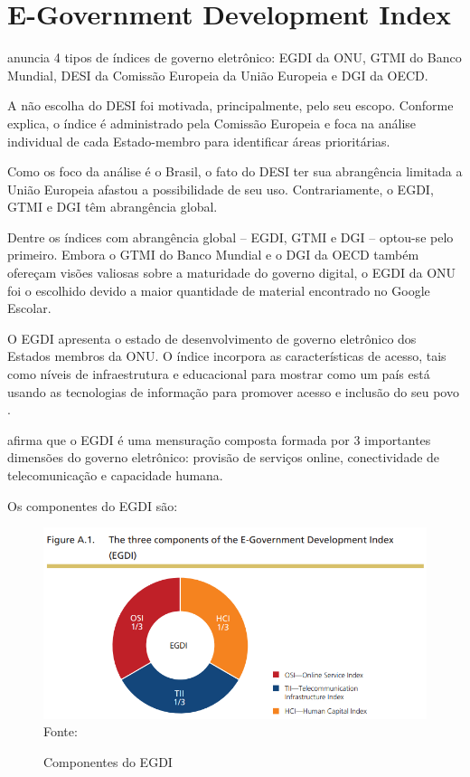\chapter{E-Government Development Index}

\cite{martinez2022egovernment} anuncia 4 tipos de índices de governo eletrônico: EGDI da ONU, GTMI do Banco Mundial, DESI da Comissão Europeia da União Europeia e DGI da OECD.

A não escolha do DESI foi motivada, principalmente, pelo seu escopo. Conforme \cite{desi_2022} explica, o índice é administrado pela Comissão Europeia e foca na análise individual de cada Estado-membro para identificar áreas prioritárias.

Como os foco da análise é o Brasil, o fato do DESI ter sua abrangência limitada a União Europeia afastou a possibilidade de seu uso. Contrariamente, o EGDI, GTMI e DGI têm abrangência global.

Dentre os índices com abrangência global – EGDI, GTMI e DGI – optou-se pelo primeiro. Embora o GTMI do Banco Mundial e o DGI da OECD também ofereçam visões valiosas sobre a maturidade do governo digital, o EGDI da ONU foi o escolhido devido a maior quantidade de material encontrado no Google Escolar.

O EGDI apresenta o estado de desenvolvimento de governo eletrônico dos Estados membros da ONU. O índice incorpora as características de acesso, tais como níveis de infraestrutura e educacional para mostrar como um país está usando as tecnologias de informação para promover acesso e inclusão do seu povo \cite{ONU_EGDI}.

\cite{ONU_EGDI} afirma que o EGDI é uma mensuração composta formada por 3 importantes dimensões do governo eletrônico: provisão de serviços online, conectividade de telecomunicação e capacidade humana.

Os componentes do EGDI são:

\begin{figure}[H]
	\centering
	\caption{Componentes do EGDI}
	\includegraphics[width=1\linewidth]{figuras/egdi/egdi_componentes.png}
	\label{fig:egdi_componentes}
	\footnotesize{Fonte: \cite{ONU_EGDI_methodology}}
\end{figure}

